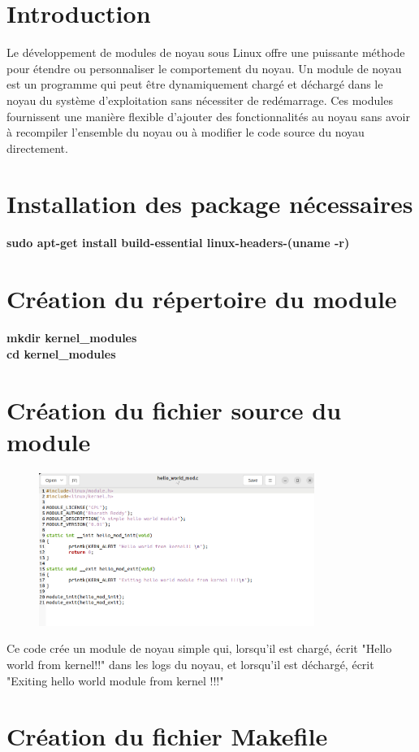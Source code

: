 \section*{Introduction}
Le développement de modules de noyau sous Linux offre une puissante méthode pour étendre ou personnaliser le comportement du noyau. Un module de noyau est un programme qui peut être dynamiquement chargé et déchargé dans le noyau du système d'exploitation sans nécessiter de redémarrage. Ces modules fournissent une manière flexible d'ajouter des fonctionnalités au noyau sans avoir à recompiler l'ensemble du noyau ou à modifier le code source du noyau directement.
\section{Installation des package nécessaires}
\textbf{sudo apt-get install build-essential linux-headers-(uname -r)}
\section{Création du répertoire du module}
\textbf{mkdir kernel\_modules}
\\\textbf{cd kernel\_modules}
\section{Création du fichier source du module}
\begin{figure}[h]
    \includegraphics[width=0.8\textwidth]{images/47.png}   
\end{figure}

Ce code crée un module de noyau simple qui, lorsqu'il est chargé, écrit "Hello world from kernel!!" dans les logs du noyau, et lorsqu'il est déchargé, écrit "Exiting hello world module from kernel !!!"

\section{Création du fichier Makefile}

